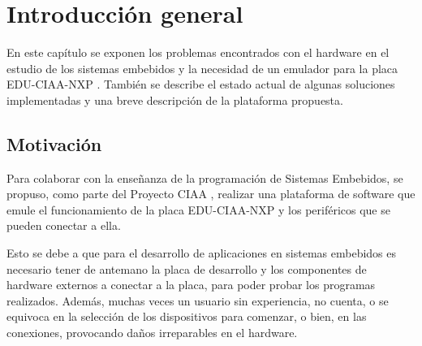 
\chapter{Introducción general} %

\label{Chapter1} %
\label{IntroGeneral}


\newcommand{\keyword}[1]{\textbf{#1}}
\newcommand{\tabhead}[1]{\textbf{#1}}
\newcommand{\code}[1]{\texttt{#1}}
\newcommand{\file}[1]{\texttt{\bfseries#1}}
\newcommand{\option}[1]{\texttt{\itshape#1}}
\newcommand{\grados}{$^{\circ}$}



En este capítulo se exponen los problemas encontrados con el hardware en el estudio de los sistemas embebidos y la necesidad de un emulador para la placa EDU-CIAA-NXP \citep{EDU-CIAA-NXP}. También se describe el estado actual de algunas soluciones implementadas y una breve descripción de la plataforma propuesta.

\section{Motivación}

Para colaborar con la enseñanza de la programación de Sistemas Embebidos, se propuso, como parte del Proyecto CIAA \citep{CIAA}, realizar una plataforma de software que emule el funcionamiento de la placa EDU-CIAA-NXP y los periféricos que se pueden conectar a ella.

Esto se debe a que para el desarrollo de aplicaciones en sistemas embebidos es necesario tener de antemano la placa de desarrollo y los componentes de hardware externos a conectar a la placa, para poder probar los programas realizados. Además, muchas veces un usuario sin experiencia, no cuenta, o se equivoca en la selección de los dispositivos para comenzar, o bien, en las conexiones, provocando daños irreparables en el hardware. 

